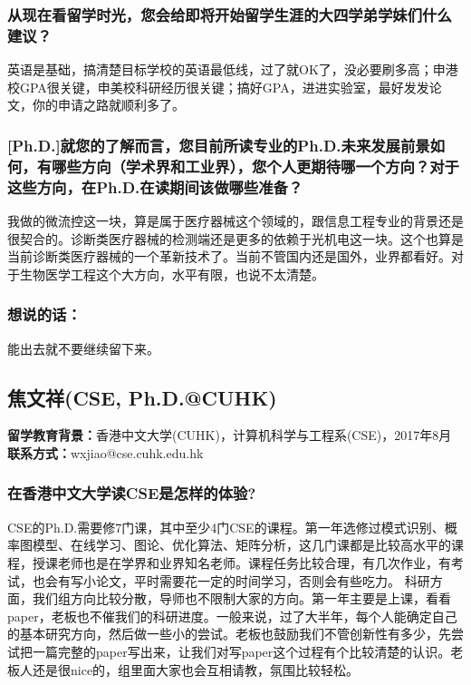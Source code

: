 \documentclass[a4paper,UTF8]{book}
\begin{document}
    \subsubsection*{从现在看留学时光，您会给即将开始留学生涯的大四学弟学妹们什么建议？}
    英语是基础，搞清楚目标学校的英语最低线，过了就OK了，没必要刷多高；申港校GPA很关键，申美校科研经历很关键；搞好GPA，进进实验室，最好发发论文，你的申请之路就顺利多了。

    \subsubsection*{[Ph.D.]就您的了解而言，您目前所读专业的Ph.D.未来发展前景如何，有哪些方向（学术界和工业界），您个人更期待哪一个方向？对于这些方向，在Ph.D.在读期间该做哪些准备？}
    我做的微流控这一块，算是属于医疗器械这个领域的，跟信息工程专业的背景还是很契合的。诊断类医疗器械的检测端还是更多的依赖于光机电这一块。这个也算是当前诊断类医疗器械的一个革新技术了。当前不管国内还是国外，业界都看好。对于生物医学工程这个大方向，水平有限，也说不太清楚。
                    
    \subsubsection{想说的话：}
    能出去就不要继续留下来。


\clearpage
\subsection{焦文祥(CSE, Ph.D.@CUHK)}
    \textbf{留学教育背景：}香港中文大学(CUHK)，计算机科学与工程系(CSE)，2017年8月\\
    \textbf{联系方式：}wxjiao@cse.cuhk.edu.hk

    \subsubsection*{在香港中文大学读CSE是怎样的体验?}
    CSE的Ph.D.需要修7门课，其中至少4门CSE的课程。第一年选修过模式识别、概率图模型、在线学习、图论、优化算法、矩阵分析，这几门课都是比较高水平的课程，授课老师也是在学界和业界知名老师。课程任务比较合理，有几次作业，有考试，也会有写小论文，平时需要花一定的时间学习，否则会有些吃力。
    科研方面，我们组方向比较分散，导师也不限制大家的方向。第一年主要是上课，看看paper，老板也不催我们的科研进度。一般来说，过了大半年，每个人能确定自己的基本研究方向，然后做一些小的尝试。老板也鼓励我们不管创新性有多少，先尝试把一篇完整的paper写出来，让我们对写paper这个过程有个比较清楚的认识。老板人还是很nice的，组里面大家也会互相请教，氛围比较轻松。
\end{document}
